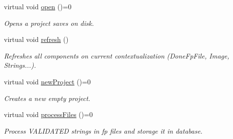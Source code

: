 \begin{DoxyCompactItemize}
\mbox{\label{classContextualizationController_ab5f48377aa2aa821695a08145bdbf522}} 
virtual void \mbox{\hyperlink{classContextualizationController_ab5f48377aa2aa821695a08145bdbf522}{open}} ()=0
\begin{DoxyCompactList}\small\item\em Opens a project saves on disk. \end{DoxyCompactList}\item 
\mbox{\label{classContextualizationController_ab0cd81ecd067cc0c6c475ce597d0f414}} 
virtual void \mbox{\hyperlink{classContextualizationController_ab0cd81ecd067cc0c6c475ce597d0f414}{refresh}} ()
\begin{DoxyCompactList}\small\item\em Refreshes all components on current contextualization (Done\+Fp\+File, Image, Strings...). \end{DoxyCompactList}\item 
\mbox{\label{classContextualizationController_a57d48e9139331145d82c1be284ecdaa5}} 
virtual void \mbox{\hyperlink{classContextualizationController_a57d48e9139331145d82c1be284ecdaa5}{new\+Project}} ()=0
\begin{DoxyCompactList}\small\item\em Creates a new empty project. \end{DoxyCompactList}\item 
\mbox{\label{classContextualizationController_a52f5a73a589942dcdf7299097aee36d1}} 
virtual void \mbox{\hyperlink{classContextualizationController_a52f5a73a589942dcdf7299097aee36d1}{process\+Files}} ()=0
\begin{DoxyCompactList}\small\item\em Process V\+A\+L\+I\+D\+A\+T\+ED strings in fp files and storage it in database. \end{DoxyCompactList}\end{DoxyCompactItemize}
